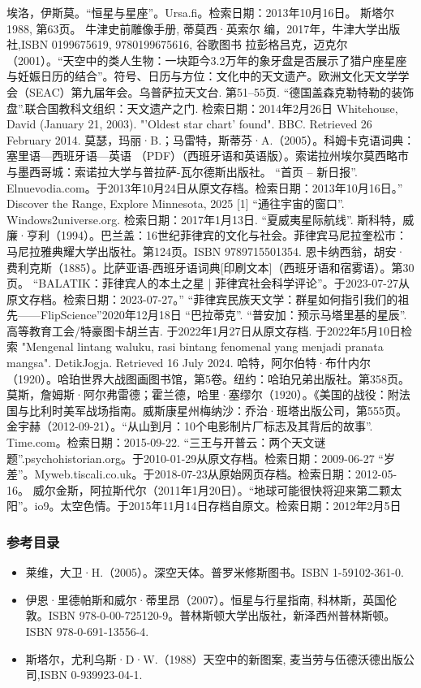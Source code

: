 \begin{enumerate}
 埃洛，伊斯莫。“恒星与星座”。Ursa.fi。检索日期：2013年10月16日。
 斯塔尔 1988, 第63页。
 牛津史前雕像手册, 蒂莫西·英索尔 编，2017年，牛津大学出版社,ISBN 0199675619, 9780199675616, 谷歌图书
 拉彭格吕克，迈克尔（2001）。“天空中的类人生物：一块距今3.2万年的象牙盘是否展示了猎户座星座与妊娠日历的结合”。符号、日历与方位：文化中的天文遗产。欧洲文化天文学学会（SEAC）第九届年会。乌普萨拉天文台. 第51–55页.
 “德国盖森克勒特勒的装饰盘”.联合国教科文组织：天文遗产之门. 检索日期：2014年2月26日
 Whitehouse, David (January 21, 2003). "'Oldest star chart' found". BBC. Retrieved 26 February 2014.
 莫瑟，玛丽·B.；马雷特，斯蒂芬·A.（2005）。科姆卡克语词典：塞里语—西班牙语—英语 （PDF）（西班牙语和英语版）。索诺拉州埃尔莫西略市与墨西哥城：索诺拉大学与普拉萨-瓦尔德斯出版社。
 “首页 – 新日报”. Elnuevodia.com。于2013年10月24日从原文存档。检索日期：2013年10月16日。”
 Discover the Range, Explore Minnesota, 2025 [1]
 “通往宇宙的窗口”. Windows2universe.org. 检索日期：2017年1月13日.
 “夏威夷星际航线”.
 斯科特，威廉·亨利（1994）。巴兰盖：16世纪菲律宾的文化与社会。菲律宾马尼拉奎松市：马尼拉雅典耀大学出版社。第124页。ISBN 9789715501354.
 恩卡纳西翁，胡安·费利克斯（1885）。比萨亚语-西班牙语词典[印刷文本]（西班牙语和宿雾语）。第30页。
 “BALATIK：菲律宾人的本土之星 | 菲律宾社会科学评论”。于2023-07-27从原文存档。检索日期：2023-07-27。”
 “菲律宾民族天文学：群星如何指引我们的祖先——FlipScience”2020年12月18日
 “巴拉蒂克”.
 “普安加：预示马塔里基的星辰”.高等教育工会/特豪图卡胡兰吉. 于2022年1月27日从原文存档. 于2022年5月10日检索
 "Mengenal lintang waluku, rasi bintang fenomenal yang menjadi pranata mangsa". DetikJogja. Retrieved 16 July 2024.
 哈特，阿尔伯特·布什内尔（1920）。哈珀世界大战图画图书馆，第5卷。纽约：哈珀兄弟出版社。第358页。
 莫斯，詹姆斯·阿尔弗雷德；霍兰德，哈里·塞缪尔（1920）。《美国的战役：附法国与比利时美军战场指南。威斯康星州梅纳沙：乔治·班塔出版公司，第555页。
 金宇赫（2012-09-21）。“从山到月：10个电影制片厂标志及其背后的故事”. Time.com。检索日期：2015-09-22.
 “三王与开普云：两个天文谜题”.psychohistorian.org。于2010-01-29从原文存档。检索日期：2009-06-27
 “岁差”。Myweb.tiscali.co.uk。于2018-07-23从原始网页存档。检索日期：2012-05-16。
 威尔金斯，阿拉斯代尔（2011年1月20日）。“地球可能很快将迎来第二颗太阳”。io9。太空色情。于2015年11月14日存档自原文。检索日期：2012年2月5日
\end{enumerate}
\subsubsection{参考目录}
\begin{itemize}
\item 莱维，大卫·H.（2005）。深空天体。普罗米修斯图书。ISBN 1-59102-361-0.
\item 伊恩·里德帕斯和威尔·蒂里昂（2007）。恒星与行星指南, 科林斯，英国伦敦。ISBN 978-0-00-725120-9。普林斯顿大学出版社，新泽西州普林斯顿。ISBN 978-0-691-13556-4.
\item 斯塔尔，尤利乌斯·D·W.（1988）天空中的新图案, 麦当劳与伍德沃德出版公司,ISBN 0-939923-04-1.
\end{itemize}